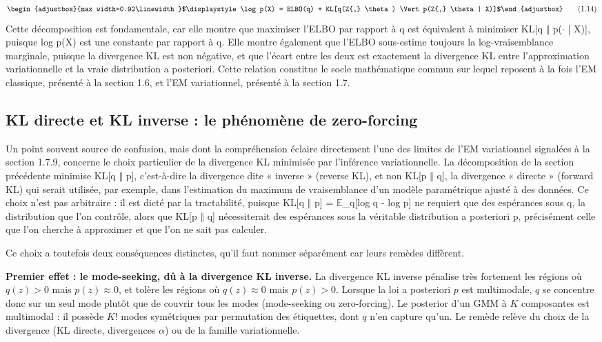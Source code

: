 \begin{equation}
\begin{adjustbox}{max width=0.92\linewidth}$\displaystyle \log  p(X) = ELBO(q) + KL[q(Z{,} \theta ) \Vert  p(Z{,} \theta  | X)]$\end{adjustbox}
\tag{1.14}
\label{eq:1_14}
\end{equation}
Cette décomposition est fondamentale, car elle montre que maximiser l'ELBO par rapport à q est équivalent à minimiser KL[q $\Vert $ p($\cdot $ | X)], puisque log p(X) est une constante par rapport à q. Elle montre également que l'ELBO sous-estime toujours la log-vraisemblance marginale, puisque la divergence KL est non négative, et que l'écart entre les deux est exactement la divergence KL entre l'approximation variationnelle et la vraie distribution a posteriori. Cette relation constitue le socle mathématique commun sur lequel reposent à la fois l'EM classique, présenté à la section 1.6, et l'EM variationnel, présenté à la section 1.7.

\subsection{KL directe et KL inverse : le phénomène de zero-forcing}
Un point souvent source de confusion, mais dont la compréhension éclaire directement l'une des limites de l'EM variationnel signalées à la section 1.7.9, concerne le choix particulier de la divergence KL minimisée par l'inférence variationnelle. La décomposition de la section précédente minimise KL[q $\Vert $ p], c'est-à-dire la divergence dite « inverse » (reverse KL), et non KL[p $\Vert $ q], la divergence « directe » (forward KL) qui serait utilisée, par exemple, dans l'estimation du maximum de vraisemblance d'un modèle paramétrique ajusté à des données. Ce choix n'est pas arbitraire : il est dicté par la tractabilité, puisque KL[q $\Vert $ p] = $\mathbb{E}$\_q[log q - log p] ne requiert que des espérances sous q, la distribution que l'on contrôle, alors que KL[p $\Vert $ q] nécessiterait des espérances sous la véritable distribution a posteriori p, précisément celle que l'on cherche à approximer et que l'on ne sait pas calculer.

Ce choix a toutefois deux conséquences distinctes, qu'il faut nommer séparément car leurs remèdes diffèrent.

\textbf{Premier effet : le mode-seeking, dû à la divergence KL inverse. }La divergence KL inverse pénalise très fortement les régions où $q(z) > 0$ mais $p(z) \approx 0$, et tolère les régions où $q(z) \approx 0$ mais $p(z) > 0$. Lorsque la loi a posteriori $p$ est multimodale, $q$ se concentre donc sur un seul mode plutôt que de couvrir tous les modes (mode-seeking ou zero-forcing). Le posterior d'un GMM à $K$ composantes est multimodal : il possède $K!$ modes symétriques par permutation des étiquettes, dont $q$ n'en capture qu'un. Le remède relève du choix de la divergence (KL directe, divergences $\alpha$) ou de la famille variationnelle.


